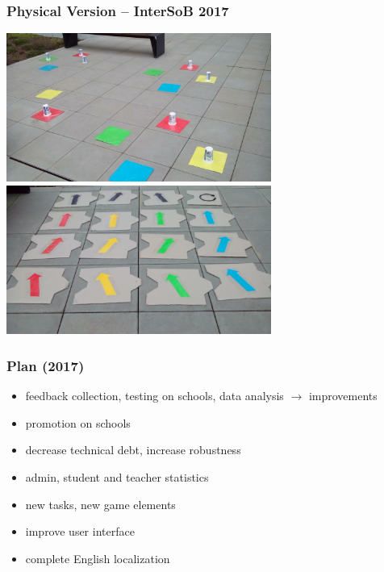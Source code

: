 \documentclass[xcolor=dvipsnames, 14pt]{beamer}
\newcommand{\imageW}[1]{%
  \makebox[\textwidth][c]{\texttt{[image: img/\#1]}}}
\begin{document}
\begin{frame}
\frametitle{Physical Version -- InterSoB 2017}
\centering
\includegraphics[width=0.65\textwidth]{img/intersob-map.jpg}\\
\includegraphics[width=0.65\textwidth]{img/intersob-blocks.jpg}
\end{frame}


\begin{frame}
\frametitle{Plan (2017)}
\begin{itemize}
\item feedback collection, testing on schools, data analysis $\rightarrow$ improvements
\item promotion on schools
\item decrease technical debt, increase robustness %
\item admin, student and teacher statistics
\item new tasks, new game elements  %
\item improve user interface %
\item complete English localization  %
\end{itemize}
\end{frame}
\end{document}

